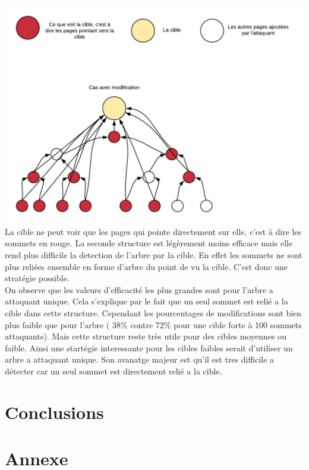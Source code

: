 \documentclass[a4paper,11pt]{article}
\begin{document}
		\includegraphics[scale = 0.5]{Captures/diagramme2.png}\\
		La cible ne peut voir que les pages qui pointe directement sur elle, c'est à dire les sommets en rouge.
		La seconde structure est légèrement moins efficace mais elle rend plus difficile la detection de l'arbre par la cible. En effet les sommets ne sont plus reliées ensemble en forme d'arbre du point de vu la cible.
		C'est donc une stratégie possible.\\
		
		On observe que les valeurs d'efficacité les plus grandes sont pour l'arbre a attaquant unique. Cela s'explique par le fait que un seul sommet est relié a la cible dans cette structure.
		Cependant les pourcentages de modifications sont bien plus faible que pour l'arbre ( 38\% contre 72\% pour une cible forte à 100 sommets attaquants).
		Mais cette structure reste très utile pour des cibles moyennes ou faible. Ainsi une startégie interessante pour les cibles faibles serait d'utiliser un arbre a attaquant unique.
		Son avanatge majeur est qu'il est tres difficile a détecter car un seul sommet est directement relié a la cible.\\
	
\section{Conclusions}

\section{Annexe}
		
		
		

		
\end{document}
